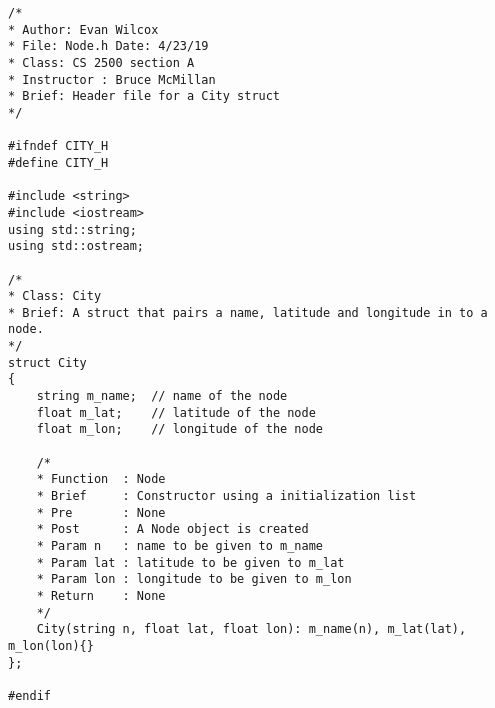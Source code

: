 \documentclass[a4paper]{article}
\begin{document}
    \begin{verbatim}
/*
* Author: Evan Wilcox
* File: Node.h Date: 4/23/19
* Class: CS 2500 section A
* Instructor : Bruce McMillan
* Brief: Header file for a City struct
*/

#ifndef CITY_H
#define CITY_H

#include <string>
#include <iostream>
using std::string;
using std::ostream;

/*
* Class: City
* Brief: A struct that pairs a name, latitude and longitude in to a node.
*/
struct City
{
    string m_name;  // name of the node
    float m_lat;    // latitude of the node
    float m_lon;    // longitude of the node

    /*
    * Function  : Node
    * Brief     : Constructor using a initialization list
    * Pre       : None
    * Post      : A Node object is created
    * Param n   : name to be given to m_name
    * Param lat : latitude to be given to m_lat
    * Param lon : longitude to be given to m_lon
    * Return    : None
    */
    City(string n, float lat, float lon): m_name(n), m_lat(lat), m_lon(lon){}
};

#endif
    \end{verbatim}
\end{document}
